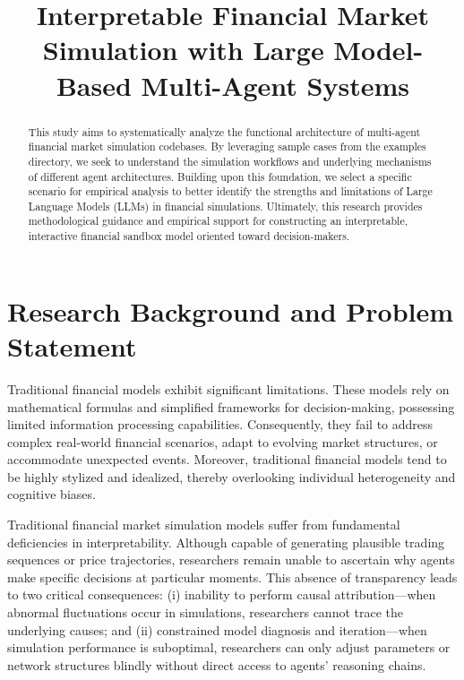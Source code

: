 \documentclass{article}
\title{Interpretable Financial Market Simulation with Large Model-Based Multi-Agent Systems }
\begin{document}
\maketitle


\begin{abstract}
This study aims to systematically analyze the functional architecture of multi-agent financial market simulation codebases. By leveraging sample cases from the examples directory, we seek to understand the simulation workflows and underlying mechanisms of different agent architectures. Building upon this foundation, we select a specific scenario for empirical analysis to better identify the strengths and limitations of Large Language Models (LLMs) in financial simulations. Ultimately, this research provides methodological guidance and empirical support for constructing an interpretable, interactive financial sandbox model oriented toward decision-makers.
\end{abstract}

\section{Research Background and Problem Statement}
\label{sec:intro}

Traditional financial models exhibit significant limitations. These models rely on mathematical formulas and simplified frameworks for decision-making, possessing limited information processing capabilities. Consequently, they fail to address complex real-world financial scenarios, adapt to evolving market structures, or accommodate unexpected events. Moreover, traditional financial models tend to be highly stylized and idealized, thereby overlooking individual heterogeneity and cognitive biases.

Traditional financial market simulation models suffer from fundamental deficiencies in interpretability. Although capable of generating plausible trading sequences or price trajectories, researchers remain unable to ascertain why agents make specific decisions at particular moments. This absence of transparency leads to two critical consequences: (i) inability to perform causal attribution—when abnormal fluctuations occur in simulations, researchers cannot trace the underlying causes; and (ii) constrained model diagnosis and iteration—when simulation performance is suboptimal, researchers can only adjust parameters or network structures blindly without direct access to agents' reasoning chains.
\end{document}
